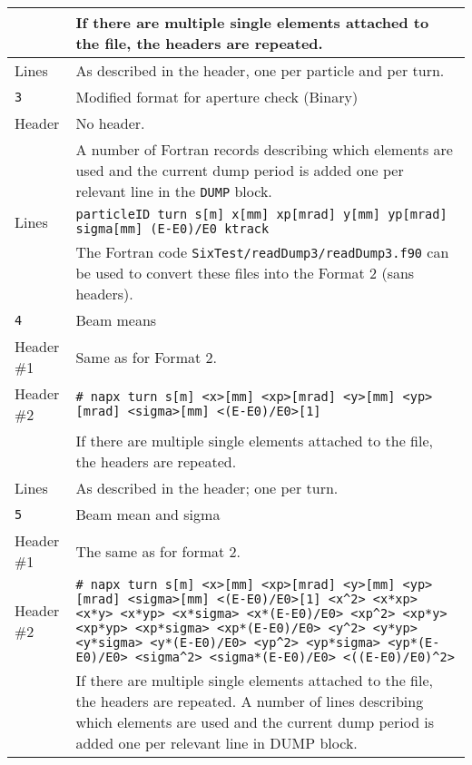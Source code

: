 \begin{center}
\begin{longtable}{|p{1.8cm}|p{13.8cm}|}
           & If there are multiple single elements attached to the file, the headers are repeated.\\
        \hline
        Lines & As described in the header, one per particle and per turn. \\
        \hline
        \rowcolor{blue!15}
        \texttt{3} & Modified format for aperture check (Binary) \\
        \hline
        Header & No header.\vspace{1mm}\\
               & A number of Fortran records describing which elements are used and the current dump period is added one per relevant line in the \texttt{DUMP} block.\\ \hline
        Lines  & \texttt{particleID turn s[m] x[mm] xp[mrad] y[mm] yp[mrad] sigma[mm] (E-E0)/E0 ktrack} \\
               & The Fortran code \texttt{SixTest/readDump3/readDump3.f90} can be used to convert these files into the Format 2 (sans headers). \\ \hline
            \hline
        \rowcolor{blue!15}
        \texttt{4} & Beam means \\
        \hline
        Header \#1 & Same as for Format 2. \\
        \hline
        Header \#2 & \texttt{\# napx turn s[m] <x>[mm] <xp>[mrad] <y>[mm] <yp>[mrad] <sigma>[mm] <(E-E0)/E0>[1]}\vspace{1mm} \\
                   & If there are multiple single elements attached to the file, the headers are repeated.\\
        \hline
        Lines      & As described in the header; one per turn. \\
        \hline
        \rowcolor{blue!15}
        \texttt{5} & Beam mean and sigma \\
        \hline
        Header \#1 & The same as for format 2.\\
        \hline
        Header \#2 & \texttt{\# napx turn s[m] <x>[mm] <xp>[mrad] <y>[mm] <yp>[mrad] <sigma>[mm] <(E-E0)/E0>[1] <x\^{}2> <x*xp> <x*y> <x*yp> <x*sigma> <x*(E-E0)/E0> <xp\^{}2> <xp*y> <xp*yp> <xp*sigma> <xp*(E-E0)/E0> <y\^{}2> <y*yp> <y*sigma> <y*(E-E0)/E0> <yp\^{}2> <yp*sigma> <yp*(E-E0)/E0> <sigma\^{}2> <sigma*(E-E0)/E0> <((E-E0)/E0)\^{}2>}\vspace{1mm} \\
                   & If there are multiple single elements attached to the file, the headers are repeated. A number of lines describing which elements are used and the current dump period is added one per relevant line in DUMP block.\\

\end{longtable}
\end{center}
